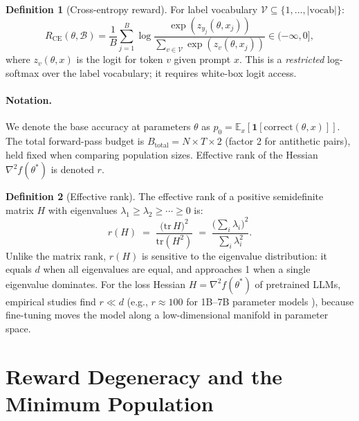 \documentclass[11pt]{article}
\theoremstyle{definition}
\newtheorem{definition}{Definition}
\theoremstyle{remark}
\newcommand{\E}{\mathbb{E}}
\begin{document}
\begin{definition}[Cross-entropy reward]
For label vocabulary $\mathcal{V} \subseteq \{1,\ldots,|\mathrm{vocab}|\}$:
\begin{equation}
  R_{\mathrm{CE}}(\theta, \mathcal{B}) = \frac{1}{B}\sum_{j=1}^{B} \log \frac{\exp(z_{y_j}(\theta, x_j))}{\sum_{v \in \mathcal{V}} \exp(z_v(\theta, x_j))} \in (-\infty, 0],
  \label{eq:ce-reward}
\end{equation}
where $z_v(\theta, x)$ is the logit for token $v$ given prompt $x$. This is a \emph{restricted} log-softmax over the label vocabulary; it requires white-box logit access.
\end{definition}

\paragraph{Notation.}
We denote the base accuracy at parameters $\theta$ as $p_0 = \E_x[\mathbf{1}[\text{correct}(\theta, x)]]$. The total forward-pass budget is $B_{\mathrm{total}} = N \times T \times 2$ (factor 2 for antithetic pairs), held fixed when comparing population sizes. Effective rank of the Hessian $\nabla^2 f(\theta^*)$ is denoted $r$.

\begin{definition}[Effective rank]
\label{def:effective-rank}
The effective rank of a positive semidefinite matrix $H$ with eigenvalues $\lambda_1 \geq \lambda_2 \geq \cdots \geq 0$ is:
\begin{equation}
  r(H) \;=\; \frac{\bigl(\mathrm{tr}\,H\bigr)^2}{\mathrm{tr}(H^2)} \;=\; \frac{\bigl(\sum_i \lambda_i\bigr)^2}{\sum_i \lambda_i^2}.
  \label{eq:effective-rank}
\end{equation}
Unlike the matrix rank, $r(H)$ is sensitive to the eigenvalue distribution: it equals $d$ when all eigenvalues are equal, and approaches 1 when a single eigenvalue dominates. For the loss Hessian $H = \nabla^2 f(\theta^*)$ of pretrained LLMs, empirical studies find $r \ll d$ (e.g., $r \approx 100$ for 1B--7B parameter models \citep{liang2026blessing}), because fine-tuning moves the model along a low-dimensional manifold in parameter space.
\end{definition}

\section{Reward Degeneracy and the Minimum Population}
\label{sec:degeneracy}
\end{document}
